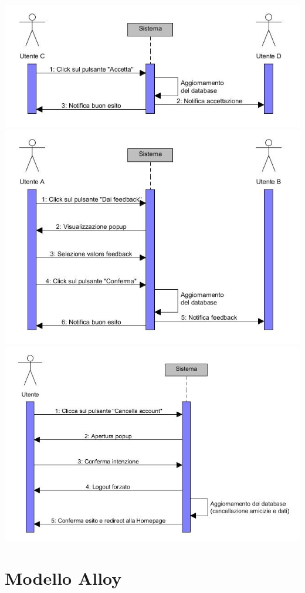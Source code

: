 \documentclass[a4paper,12pt]{article}
\begin{document}
\begin{flushleft}
\includegraphics[scale=0.8]{sDiagrams/accettazioneAmicizia.jpg} \\[2\baselineskip]
\includegraphics[scale=0.8]{sDiagrams/invioFeedback.jpg} \\[2\baselineskip]
\includegraphics[scale=0.8]{sDiagrams/cancellazioneAccount.jpg} \\[2\baselineskip]
\end{flushleft}

\section{Modello Alloy}
\end{document}
